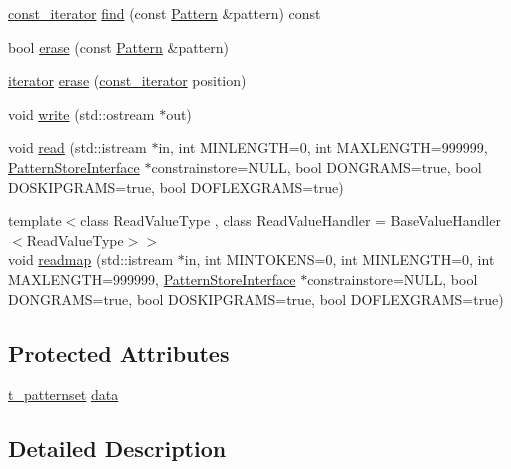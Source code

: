 \begin{DoxyCompactItemize}
\item 
\hyperlink{classPatternSet_a5d419991ea0abb0fbc4a2282574b1b8c}{const\+\_\+iterator} \hyperlink{classPatternSet_a56c0fcc8deb357628e778d3cc0d3c418}{find} (const \hyperlink{classPattern}{Pattern} \&pattern) const 
\item 
bool \hyperlink{classPatternSet_afd2c053ac589e30edd7eda5c9f95c771}{erase} (const \hyperlink{classPattern}{Pattern} \&pattern)
\item 
\hyperlink{classPatternSet_a18b78ea966c57db2373741291ba610f3}{iterator} \hyperlink{classPatternSet_afbcbec2296a6ea98b809dcd9288eb756}{erase} (\hyperlink{classPatternSet_a5d419991ea0abb0fbc4a2282574b1b8c}{const\+\_\+iterator} position)
\item 
void \hyperlink{classPatternSet_ae55073ee2384d529faf51fca22c8dee1}{write} (std\+::ostream $\ast$out)
\item 
void \hyperlink{classPatternSet_a97bff883909c96f3f8a07a9c9ef83d84}{read} (std\+::istream $\ast$in, int M\+I\+N\+L\+E\+N\+G\+T\+H=0, int M\+A\+X\+L\+E\+N\+G\+T\+H=999999, \hyperlink{classPatternStoreInterface}{Pattern\+Store\+Interface} $\ast$constrainstore=N\+U\+L\+L, bool D\+O\+N\+G\+R\+A\+M\+S=true, bool D\+O\+S\+K\+I\+P\+G\+R\+A\+M\+S=true, bool D\+O\+F\+L\+E\+X\+G\+R\+A\+M\+S=true)
\item 
{\footnotesize template$<$class Read\+Value\+Type , class Read\+Value\+Handler  = Base\+Value\+Handler$<$\+Read\+Value\+Type$>$$>$ }\\void \hyperlink{classPatternSet_a7c974deb65a7b48ada65a4b4a45a5a3f}{readmap} (std\+::istream $\ast$in, int M\+I\+N\+T\+O\+K\+E\+N\+S=0, int M\+I\+N\+L\+E\+N\+G\+T\+H=0, int M\+A\+X\+L\+E\+N\+G\+T\+H=999999, \hyperlink{classPatternStoreInterface}{Pattern\+Store\+Interface} $\ast$constrainstore=N\+U\+L\+L, bool D\+O\+N\+G\+R\+A\+M\+S=true, bool D\+O\+S\+K\+I\+P\+G\+R\+A\+M\+S=true, bool D\+O\+F\+L\+E\+X\+G\+R\+A\+M\+S=true)
\end{DoxyCompactItemize}
\subsection*{Protected Attributes}
\begin{DoxyCompactItemize}
\item 
\hyperlink{patternstore_8h_a29bbbbc6d95519f30358276784e16c25}{t\+\_\+patternset} \hyperlink{classPatternSet_afa1d4a71d4b1f17a5fa5fba98f637687}{data}
\end{DoxyCompactItemize}


\subsection{Detailed Description}

